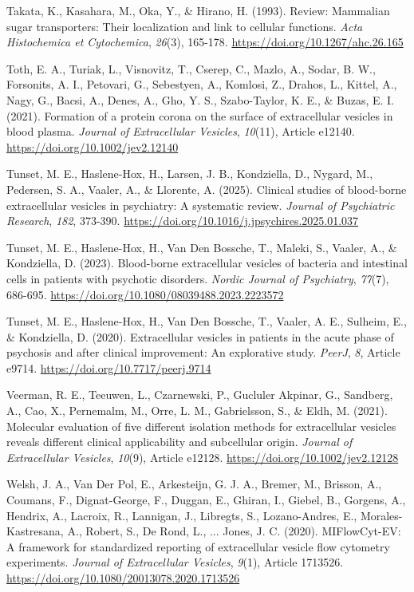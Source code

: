 \documentclass[authordate, empirical, issue]{jote-new-article}
\begin{document}
	Takata, K., Kasahara, M., Oka, Y., \& Hirano, H. (1993). Review: Mammalian sugar transporters: Their localization and link to cellular functions. \emph{Acta Histochemica et Cytochemica},\emph{ 26}(3), 165-178. \url{https://doi.org/10.1267/ahc.26.165}



	Toth, E. A., Turiak, L., Visnovitz, T., Cserep, C., Mazlo, A., Sodar, B. W., Forsonits, A. I., Petovari, G., Sebestyen, A., Komlosi, Z., Drahos, L., Kittel, A., Nagy, G., Bacsi, A., Denes, A., Gho, Y. S., Szabo-Taylor, K. E., \& Buzas, E. I. (2021). Formation of a protein corona on the surface of extracellular vesicles in blood plasma. \emph{Journal of Extracellular Vesicles},\emph{ 10}(11), Article e12140. \url{https://doi.org/10.1002/jev2.12140}



	Tunset, M. E., Haslene-Hox, H., Larsen, J. B., Kondziella, D., Nygard, M., Pedersen, S. A., Vaaler, A., \& Llorente, A. (2025). Clinical studies of blood-borne extracellular vesicles in psychiatry: A systematic review. \emph{Journal of Psychiatric Research},\emph{ 182}, 373-390. \url{https://doi.org/10.1016/j.jpsychires.2025.01.037}



	Tunset, M. E., Haslene-Hox, H., Van Den Bossche, T., Maleki, S., Vaaler, A., \& Kondziella, D. (2023). Blood-borne extracellular vesicles of bacteria and intestinal cells in patients with psychotic disorders. \emph{Nordic Journal of Psychiatry},\emph{ 77}(7), 686-695. \url{https://doi.org/10.1080/08039488.2023.2223572}



	Tunset, M. E., Haslene-Hox, H., Van Den Bossche, T., Vaaler, A. E., Sulheim, E., \& Kondziella, D. (2020). Extracellular vesicles in patients in the acute phase of psychosis and after clinical improvement: An explorative study. \emph{PeerJ},\emph{ 8}, Article e9714. \url{https://doi.org/10.7717/peerj.9714}



	Veerman, R. E., Teeuwen, L., Czarnewski, P., Gucluler Akpinar, G., Sandberg, A., Cao, X., Pernemalm, M., Orre, L. M., Gabrielsson, S., \& Eldh, M. (2021). Molecular evaluation of five different isolation methods for extracellular vesicles reveals different clinical applicability and subcellular origin. \emph{Journal of Extracellular Vesicles},\emph{ 10}(9), Article e12128. \url{https://doi.org/10.1002/jev2.12128}



	Welsh, J. A., Van Der Pol, E., Arkesteijn, G. J. A., Bremer, M., Brisson, A., Coumans, F., Dignat-George, F., Duggan, E., Ghiran, I., Giebel, B., Gorgens, A., Hendrix, A., Lacroix, R., Lannigan, J., Libregts, S., Lozano-Andres, E., Morales-Kastresana, A., Robert, S., De Rond, L., ... Jones, J. C. (2020). MIFlowCyt-EV: A framework for standardized reporting of extracellular vesicle flow cytometry experiments. \emph{Journal of Extracellular Vesicles},\emph{ 9}(1), Article 1713526. \url{https://doi.org/10.1080/20013078.2020.1713526}
\end{document}
